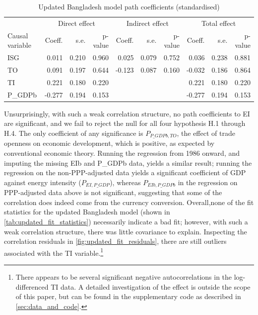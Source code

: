 \documentclass[11pt,a4paper]{article}
\begin{document}
\begin{table}[tbp]
\centering
\begin{adjustbox}{max width=\textwidth}
\begin{tabular}{l|rrr|rrr|rrr}
\toprule
 				& \multicolumn{3}{c|}{Direct effect}  & \multicolumn{3}{c|}{Indirect effect} & \multicolumn{3}{c}{Total effect} \\
Causal variable & Coeff. & s.e. & p-value & Coeff. & s.e. & p-value & Coeff. & s.e. & p-value \\
\midrule
            ISG &     0.011 &   0.210 &      0.960 &     0.025 &   0.079 &      0.752 &     0.036 &   0.238 &      0.881 \\
             TO &     0.091 &   0.197 &      0.644 &    -0.123 &   0.087 &      0.160 &    -0.032 &   0.186 &      0.864 \\
             TI &     0.221 &   0.180 &      0.220 &           &         &            &     0.221 &   0.180 &      0.220 \\
        P\_GDPb &    -0.277 &   0.194 &      0.153 &           &         &            &    -0.277 &   0.194 &      0.153 \\
\bottomrule
\end{tabular}
\end{adjustbox}
\caption{Updated Bangladesh model path coefficients (standardised)}
\label{tab:updated_path_coeff}
\end{table}

Unsurprisingly, with such a weak correlation structure, no path coefficients to EI are significant, and we fail to reject the null for all four hypothesis H.1 through H.4.
The only coefficient of any significance is $P_{P\_GDPb,TO}$, the effect of trade openness on economic development, which is positive, as expected by conventional economic theory. 
Running the regression from 1986 onward, and imputing the missing EIb and P\_GDPb data, yields a similar result; running the regression on the non-PPP-adjusted data yields a significant coefficient of GDP against energy intensity ($P_{EI,P\_GDP}$), whereas $P_{EIb,P\_GDPb}$ in the regression on PPP-adjusted data above is not significant, suggesting that some of the correlation does indeed come from the currency conversion. 
Overall,none of the fit statistics for the updated Bangladesh model (shown in \cref{tab:updated_fit_statistics}) necessarily indicate a bad fit; however, with such a weak correlation structure, there was little covariance to explain. Inspecting the correlation residuals in \cref{fig:updated_fit_residuals}, there are still outliers associated with the TI variable.\footnote{
There appears to be several significant negative autocorrelations in the log-differenced TI data. 
A detailed investigation of the effect is outside the scope of this paper, but can be found in the supplementary code as described in \cref{sec:data_and_code}.
}
\end{document}
